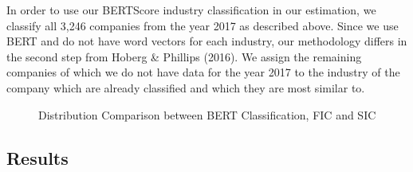 \documentclass[
]{article}
\begin{document}
In order to use our BERTScore industry classification in our estimation,
we classify all 3,246 companies from the year 2017 as described above.
Since we use BERT and do not have word vectors for each industry, our
methodology differs in the second step from Hoberg \& Phillips (2016).
We assign the remaining companies of which we do not have data for the
year 2017 to the industry of the company which are already classified
and which they are most similar to.

\begin{figure}


\caption{\label{fig-2}Distribution Comparison between BERT
Classification, FIC and SIC}

\end{figure}%

\subsection{Results}\label{results}
\end{document}
